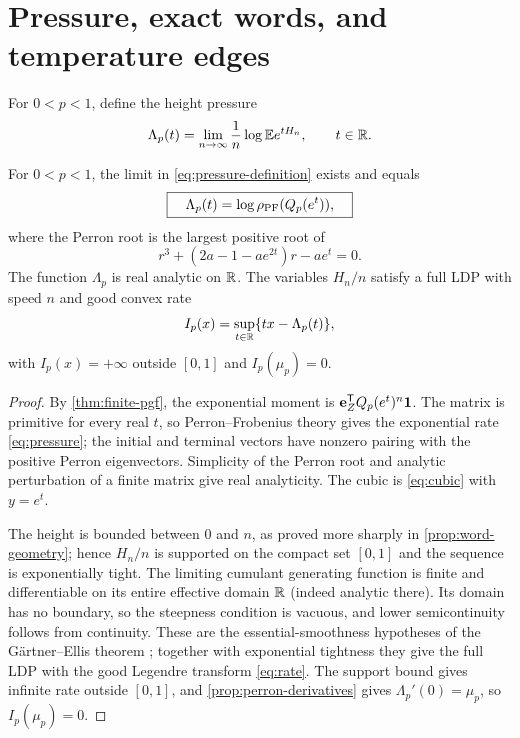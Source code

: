 \section{Pressure, exact words, and temperature edges}
\label{sec:pressure}

For $0<p<1$, define the height pressure
\begin{equation}
 \label{eq:pressure-definition}
 \Lambda_p(t)=\lim_{n\to\infty}\frac1n
 \log\mathbb{E} e^{tH_n},\qquad t\in\mathbb{R}.
\end{equation}

\begin{theorem}
\label{thm:pressure-ldp}
For $0<p<1$, the limit in \eqref{eq:pressure-definition} exists and equals
\begin{equation}
 \label{eq:pressure}
 \boxed{\quad
 \Lambda_p(t)=\log\rho_{\mathrm{PF}}(Q_p(e^t)),
 \quad}
\end{equation}
where the Perron root is the largest positive root of
\begin{equation}
 \label{eq:pressure-cubic}
 r^3+(2a-1-ae^{2t})r-ae^t=0.
\end{equation}
The function $\Lambda_p$ is real analytic on $\mathbb{R}$.  The variables $H_n/n$
satisfy a full LDP with speed $n$ and good convex rate
\begin{equation}
 \label{eq:rate}
 I_p(x)=\sup_{t\in\mathbb{R}}\{tx-\Lambda_p(t)\},
\end{equation}
with $I_p(x)=+\infty$ outside $[0,1]$ and $I_p(\mu_p)=0$.
\end{theorem}

\begin{proof}
By \cref{thm:finite-pgf}, the exponential moment is
$\mathbf e_{Z}^{\mathsf T}Q_p(e^t)^n\mathbf{1}$.  The matrix is primitive for every real
$t$, so Perron--Frobenius theory gives the exponential rate
\eqref{eq:pressure}; the initial and terminal vectors have nonzero pairing
with the positive Perron eigenvectors.  Simplicity of the Perron root and
analytic perturbation of a finite matrix give real analyticity.  The cubic
is \eqref{eq:cubic} with $y=e^t$.

The height is bounded between $0$ and $n$, as proved more sharply in
\cref{prop:word-geometry}; hence $H_n/n$ is supported on the compact set
$[0,1]$ and the sequence is exponentially tight.  The limiting cumulant
generating function is finite and differentiable on its entire effective
domain $\mathbb{R}$ (indeed analytic there).  Its domain has no boundary, so the
steepness condition is vacuous, and lower semicontinuity follows from
continuity.  These are the essential-smoothness hypotheses of the
G\"artner--Ellis theorem \cite{DemboZeitouni2010}; together with exponential
tightness they give the full LDP with the good Legendre transform
\eqref{eq:rate}.  The support bound gives infinite rate outside $[0,1]$,
and \cref{prop:perron-derivatives} gives $\Lambda_p'(0)=\mu_p$, so
$I_p(\mu_p)=0$.
\end{proof}


